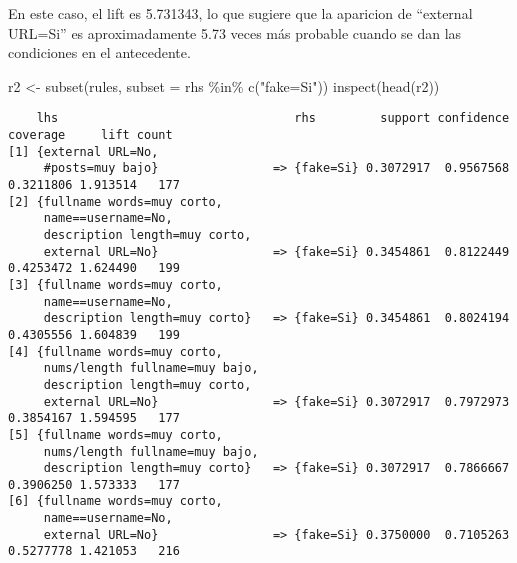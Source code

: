 \documentclass[
  letterpaper,
  DIV=11,
  numbers=noendperiod]{scrreprt}
\newenvironment{Shaded}{\begin{snugshade}}{\end{snugshade}}
\newcommand{\AttributeTok}[1]{\textcolor[rgb]{0.40,0.45,0.13}{#1}}
\newcommand{\FunctionTok}[1]{\textcolor[rgb]{0.28,0.35,0.67}{#1}}
\newcommand{\NormalTok}[1]{\textcolor[rgb]{0.00,0.23,0.31}{#1}}
\newcommand{\OtherTok}[1]{\textcolor[rgb]{0.00,0.23,0.31}{#1}}
\newcommand{\SpecialCharTok}[1]{\textcolor[rgb]{0.37,0.37,0.37}{#1}}
\newcommand{\StringTok}[1]{\textcolor[rgb]{0.13,0.47,0.30}{#1}}
\begin{document}
En este caso, el lift es 5.731343, lo que sugiere que la aparicion de
``external URL=Si'' es aproximadamente 5.73 veces más probable cuando se
dan las condiciones en el antecedente.

\begin{Shaded}
\begin{Highlighting}[]
\NormalTok{r2 }\OtherTok{\textless{}{-}} \FunctionTok{subset}\NormalTok{(rules, }\AttributeTok{subset =}\NormalTok{ rhs }\SpecialCharTok{\%in\%} \FunctionTok{c}\NormalTok{(}\StringTok{"fake=Si"}\NormalTok{)) }
\FunctionTok{inspect}\NormalTok{(}\FunctionTok{head}\NormalTok{(r2))}
\end{Highlighting}
\end{Shaded}

\begin{verbatim}
    lhs                                 rhs         support confidence  coverage     lift count
[1] {external URL=No,                                                                          
     #posts=muy bajo}                => {fake=Si} 0.3072917  0.9567568 0.3211806 1.913514   177
[2] {fullname words=muy corto,                                                                 
     name==username=No,                                                                        
     description length=muy corto,                                                             
     external URL=No}                => {fake=Si} 0.3454861  0.8122449 0.4253472 1.624490   199
[3] {fullname words=muy corto,                                                                 
     name==username=No,                                                                        
     description length=muy corto}   => {fake=Si} 0.3454861  0.8024194 0.4305556 1.604839   199
[4] {fullname words=muy corto,                                                                 
     nums/length fullname=muy bajo,                                                            
     description length=muy corto,                                                             
     external URL=No}                => {fake=Si} 0.3072917  0.7972973 0.3854167 1.594595   177
[5] {fullname words=muy corto,                                                                 
     nums/length fullname=muy bajo,                                                            
     description length=muy corto}   => {fake=Si} 0.3072917  0.7866667 0.3906250 1.573333   177
[6] {fullname words=muy corto,                                                                 
     name==username=No,                                                                        
     external URL=No}                => {fake=Si} 0.3750000  0.7105263 0.5277778 1.421053   216
\end{verbatim}
\end{document}

